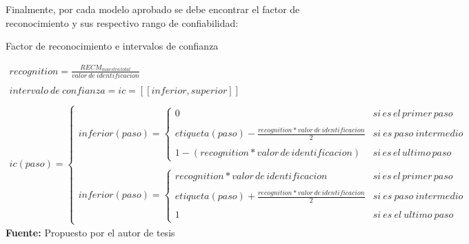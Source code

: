 Finalmente, por cada modelo aprobado se debe encontrar el factor de reconocimiento y sus respectivo rango de confiabilidad:
\begin{formula}[H]
	\centering
	\caption{Factor de reconocimiento e intervalos de confianza}
	\label{frm:rangoConfiabilidad}
	\begin{equation}
\begin{matrix}
recognition=\frac{RECM_{muestra\, total}}{valor\: de\: identificacion}  \\ 
\\
intervalo\: de\: confianza = ic =[[inferior,superior]] \\
\\
ic(paso)=\left\{\begin{matrix}
inferior(paso)=\left\{\begin{matrix}
0 & si\, es\, el\, primer\, paso\\ \\ 
etiqueta(paso)-\frac{recognition*valor\, de\, identificacion}{2} & si\: es\: paso\: intermedio \\ 
\\
1-(recognition*valor\, de\, identificacion)& si\, es\, el\, ultimo\, paso
\end{matrix}\right. \\ 
\\ 
inferior(paso)=\left\{\begin{matrix}
recognition*valor\, de\, identificacion& si\, es\, el\, primer\, paso \\
\\
etiqueta(paso)+\frac{recognition*valor\, de\, identificacion}{2} & si\: es\: paso\: intermedio \\ \\ 
1 & si\: es\: el\: ultimo\: paso
\end{matrix}\right.
\end{matrix}\right.
\end{matrix}
	\end{equation}
	\textbf{Fuente:} Propuesto por el autor de tesis
\end{formula} 
